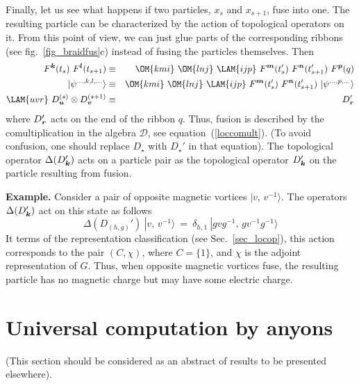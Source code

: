 \documentclass[12pt]{article}
\newcommand{\del}{\delta} %
\newcommand*{\boldind}[1]{{\mbox{\scriptsize\boldmath$#1$}}}
\newcommand*{\RD}[1]{D_\boldind{#1}}
\newcommand*{\RF}[1]{F^\boldind{#1}}
\newcommand{\calD}{\mathcal{D}}
\begin{document}
Finally, let us see what happens if two particles, $x_s$ and $x_{s+1}$, fuse
into one. The resulting particle can be characterized by the action of
topological operators on it. From this point of view, we can just glue parts
of the corresponding ribbons (see fig.~\ref{fig_braidfus}c) instead of fusing
the particles themselves. Then
\begin{eqnarray}
  \RF{k}(t_s)\ \RF{l}(t_{s+1}) &\equiv&
  \OM{kmi}\ \OM{lnj}\ \LAM{ijp}\ \RF{m}(t'_s)\ \RF{n}(t'_{s+1})\ \RF{p}(q)
\nonumber\\
  |\psi^{\ldots,k,l,\ldots}\rangle &\equiv&
  \OM{kmi}\ \OM{lnj}\ \LAM{ijp}\ \RF{m}(t'_s)\ \RF{n}(t'_{s+1})\ 
  |\psi^{\ldots,p,\ldots}\rangle
\nonumber\\
  \LAM{uvr}\ \RD{u}^{(s)}\otimes\RD{v}^{(s+1)} &\equiv&
  \RD{r}'
\nonumber
\end{eqnarray}
where $\RD{r}'$ acts on the end of the ribbon $q$. Thus, fusion is described
by the comultiplication in the algebra $\calD$, see equation~(\ref{loccomult}).
(To avoid confusion, one should replace $D_\star$ with $D_\star'$ in that
equation).  The topological operator $\Delta(\RD{k}')$ acts on a particle pair
as the topological operator $\RD{k}'$ on the particle resulting from fusion.
\smallskip

\noindent\textbf{Example.} Consider a pair of opposite magnetic vortices 
$|v,\,v^{-1}\rangle$. The operators $\Delta(\RD{k}')$ act on this state as
follows
\begin{equation} \label{vortfusion}
  \Delta(D_{(h,g)}')\ |v,\,v^{-1}\rangle\ =\ 
  \del_{h,1}\ |gvg^{-1},\,gv^{-1}g^{-1}\rangle
\end{equation}
It terms of the representation classification (see Sec.~\ref{sec_locop}), this
action corresponds to the pair $(C,\chi)$, where $C=\{1\}$, and $\chi$ is the
adjoint representation of $G$. Thus, when opposite magnetic vortices fuse, the
resulting particle has no magnetic charge but may have some electric charge.


\section{Universal computation by anyons} \label{sec_univers}
(This section should be considered as an abstract of results to be presented
elsewhere).
\bigskip
\end{document}
